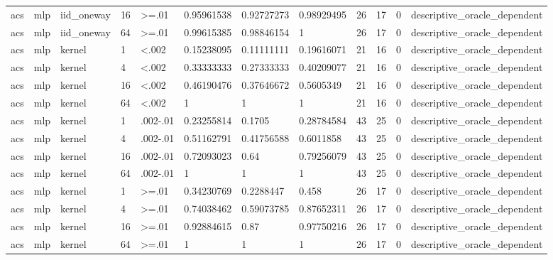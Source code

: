 \begin{tabular}{llllllllllll}
acs & mlp & iid\_oneway & 16 & >=.01 & 0.95961538 & 0.92727273 & 0.98929495 & 26 & 17 & 0 & descriptive\_oracle\_dependent \\
acs & mlp & iid\_oneway & 64 & >=.01 & 0.99615385 & 0.98846154 & 1 & 26 & 17 & 0 & descriptive\_oracle\_dependent \\
acs & mlp & kernel & 1 & <.002 & 0.15238095 & 0.11111111 & 0.19616071 & 21 & 16 & 0 & descriptive\_oracle\_dependent \\
acs & mlp & kernel & 4 & <.002 & 0.33333333 & 0.27333333 & 0.40209077 & 21 & 16 & 0 & descriptive\_oracle\_dependent \\
acs & mlp & kernel & 16 & <.002 & 0.46190476 & 0.37646672 & 0.5605349 & 21 & 16 & 0 & descriptive\_oracle\_dependent \\
acs & mlp & kernel & 64 & <.002 & 1 & 1 & 1 & 21 & 16 & 0 & descriptive\_oracle\_dependent \\
acs & mlp & kernel & 1 & .002-.01 & 0.23255814 & 0.1705 & 0.28784584 & 43 & 25 & 0 & descriptive\_oracle\_dependent \\
acs & mlp & kernel & 4 & .002-.01 & 0.51162791 & 0.41756588 & 0.6011858 & 43 & 25 & 0 & descriptive\_oracle\_dependent \\
acs & mlp & kernel & 16 & .002-.01 & 0.72093023 & 0.64 & 0.79256079 & 43 & 25 & 0 & descriptive\_oracle\_dependent \\
acs & mlp & kernel & 64 & .002-.01 & 1 & 1 & 1 & 43 & 25 & 0 & descriptive\_oracle\_dependent \\
acs & mlp & kernel & 1 & >=.01 & 0.34230769 & 0.2288447 & 0.458 & 26 & 17 & 0 & descriptive\_oracle\_dependent \\
acs & mlp & kernel & 4 & >=.01 & 0.74038462 & 0.59073785 & 0.87652311 & 26 & 17 & 0 & descriptive\_oracle\_dependent \\
acs & mlp & kernel & 16 & >=.01 & 0.92884615 & 0.87 & 0.97750216 & 26 & 17 & 0 & descriptive\_oracle\_dependent \\
acs & mlp & kernel & 64 & >=.01 & 1 & 1 & 1 & 26 & 17 & 0 & descriptive\_oracle\_dependent \\
\bottomrule
\end{tabular}
